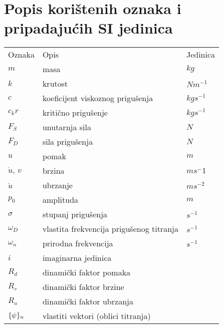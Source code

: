 \chapter*{Popis korištenih oznaka i pripadajućih SI jedinica}
\begin{tabularx}{\textwidth}{X l l}
    Oznaka                      & Opis                                      & Jedinica\\
    $m$                         & masa                                      & $kg$\\
    $k$                         & krutost                                   & $Nm^{-1}$\\
    $c$                         & koeficijent viskoznog prigušenja          & $kgs^{-1}$\\
    $c_kr$                      & kritično prigušenje                       & $kgs^{-1}$\\
    $F_S$                       & unutarnja sila                            & $N$\\
    $F_D$                       & sila prigušenja                           & $N$\\
    $u$                         & pomak                                     & $m$\\
    $\dot{u},\, v$              & brzina                                    & $m{s^-1}$\\
    $\ddot{u}$                  & ubrzanje                                  & $ms^{-2}$\\
    $p_0$                       & amplituda                                 & $m$\\
    $\sigma$                    & stupanj prigušenja                        & $s^{-1}$\\
    $\omega_D$                  & vlastita frekvencija prigušenog titranja  & $s^{-1}$\\
    $\omega_n$                  & prirodna frekvencija                      & $s^{-1}$\\
    $i$                         & imaginarna jedinica                       & \\
    $R_d$                       & dinamički faktor pomaka                   & \\
    $R_v$                       & dinamički faktor brzine                   & \\
    $R_a$                       & dinamički faktor ubrzanja                 & \\
    $\vtor{\psi}{}_n$           & vlastiti vektori (oblici titranja)        & \\

\end{tabularx}
